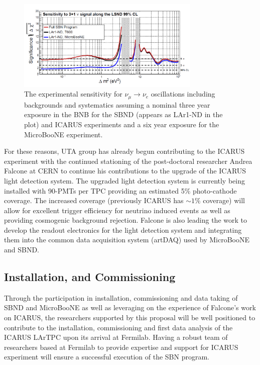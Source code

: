 \begin{figure}[htb]
\centering
\includegraphics[width=0.78\textwidth]{images/Sensitivity.png}
\caption[]{The experimental sensitivity for $\nu_{\mu} \rightarrow \nu_{e}$ oscillations including backgrounds and systematics assuming a nominal three year exposure in the BNB for the SBND (appears as LAr1-ND in the plot) and ICARUS experiments and a six year exposure for the MicroBooNE experiment.}
\label{fig:sense}
\end{figure}

For these reasons, UTA group has already begun contributing to the ICARUS experiment with the continued stationing of the post-doctoral researcher Andrea Falcone at CERN to continue his contributions to the upgrade of the ICARUS light detection system. The upgraded light detection system is currently being installed with 90-PMTs per TPC providing an estimated 5$\%$ photo-cathode coverage. The increased coverage (previously ICARUS has $\sim 1\%$ coverage) will allow for excellent trigger efficiency for neutrino induced events as well as providing cosmogenic background rejection. Falcone is also leading the work to develop the readout electronics for the light detection system and integrating them into the common data acquisition system (artDAQ) used by MicroBooNE and SBND.

\subsection{Installation, and Commissioning}\label{sec:ICARUSBulid}
Through the participation in installation, commissioning and data taking of SBND and MicroBooNE as well as leveraging on the experience of Falcone's work on ICARUS, the researchers supported by this proposal will be well positioned to contribute to the installation, commissioning and first data analysis of the ICARUS LArTPC upon its arrival at Fermilab. Having a robust team of researchers based at Fermilab to provide expertise and support for ICARUS experiment will ensure a successful execution of the SBN program.

